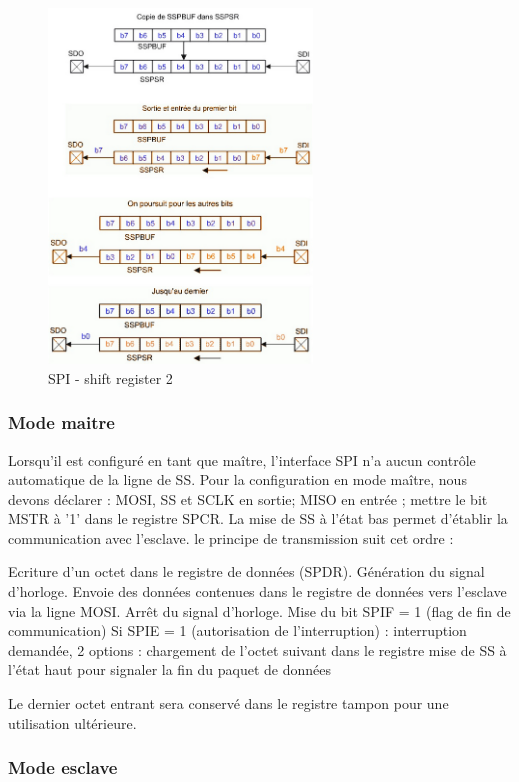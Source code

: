 \documentclass[french,a4paper,12pt]{report}
\begin{document}
	\begin{figure}[!ht]
    \center
  	\includegraphics[width=7cm]{SPI4.png}
    \caption{SPI - shift register 2}
	\end{figure}
 
  		\subsubsection{Mode maitre}
  		
  		Lorsqu'il est configuré en tant que maître, l'interface SPI n'a aucun contrôle automatique de la ligne de SS. Pour la configuration en mode maître, nous devons déclarer : MOSI, SS et SCLK en sortie; MISO en entrée ; mettre le bit MSTR à '1' dans le registre SPCR. La mise de SS à l’état bas permet
d'établir la communication avec l’esclave.
le principe de transmission suit cet ordre :
 
    Ecriture d’un octet dans le registre de données (SPDR).
    Génération du signal d'horloge.
    Envoie des données contenues dans le registre de données vers l’esclave via la ligne MOSI.
    Arrêt du signal d'horloge.
    Mise du bit SPIF = 1 (flag de fin de communication)
    Si SPIE = 1 (autorisation de l’interruption) : interruption demandée, 2 options :
        chargement de l’octet suivant dans le registre
        mise de SS à l’état haut pour signaler la fin du paquet de données
 
	Le dernier octet entrant sera conservé dans le registre tampon pour une utilisation ultérieure.
 
  		\subsubsection{Mode esclave}
  		
\end{document}
